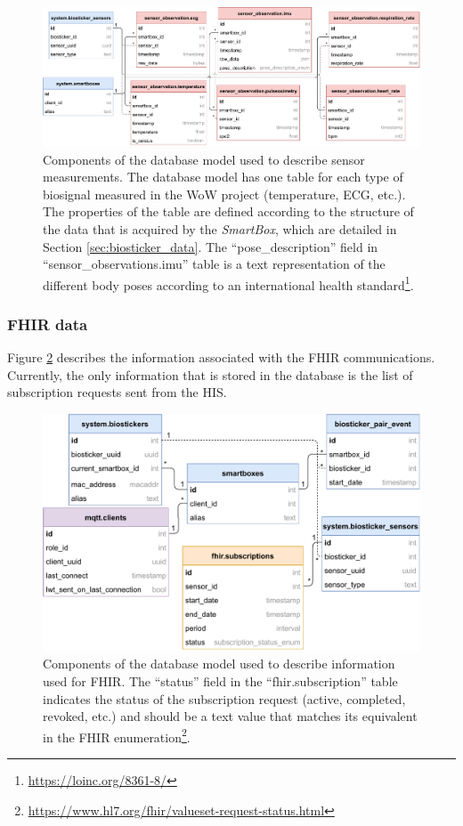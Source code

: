\begin{figure}[H]
    \centering
    \includegraphics[width=\linewidth]{images/database-schema-sensordata.pdf}
    \caption[Components of the database model used to describe sensor measurements.]{Components of the database model used to describe sensor measurements. The database model has one table for each type of biosignal measured in the \acs{WoW} project (temperature, \acs{ECG}, etc.). The properties of the table are defined according to the structure of the data that is acquired by the \textit{SmartBox}, which are detailed in Section \ref{sec:biosticker_data}. The ``pose\_description'' field in ``sensor\_observations.imu'' table is a text representation of the different body poses according to an international health standard\footnote{\url{https://loinc.org/8361-8/}}. }
    \label{fig:wow-dbschema-sensors}
\end{figure}



\subsubsection{\acs{FHIR} data}

Figure \ref{fig:wow-dbschema-fhir} describes the information associated with the \acs{FHIR} communications. Currently, the only information that is stored in the database is the list of subscription requests sent from the \acs{HIS}.

\begin{figure}[H]
    \centering
    \includegraphics[width=0.66\linewidth]{images/database-schema-fhir.pdf}
    \caption[Components of the database model used to describe information used for \acs{FHIR}.]{Components of the database model used to describe information used for \acs{FHIR}. The ``status'' field in the ``fhir.subscription'' table indicates the status of the subscription request (active, completed, revoked, etc.) and should be a text value that matches its equivalent in the \acs{FHIR} enumeration\footnote{\url{https://www.hl7.org/fhir/valueset-request-status.html}}.}
    \label{fig:wow-dbschema-fhir}
\end{figure}

